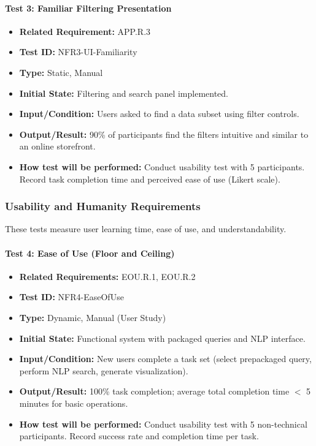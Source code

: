 \documentclass[12pt, titlepage]{article}
\begin{document}
\paragraph{Test 3: Familiar Filtering Presentation}
\begin{itemize}
    \item \textbf{Related Requirement:} APP.R.3
    \item \textbf{Test ID:} NFR3-UI-Familiarity
    \item \textbf{Type:} Static, Manual
    \item \textbf{Initial State:} Filtering and search panel implemented.
    \item \textbf{Input/Condition:} Users asked to find a data subset using filter controls.
    \item \textbf{Output/Result:} 90\% of participants find the filters intuitive and similar to an online storefront.
    \item \textbf{How test will be performed:} Conduct usability test with 5 participants. Record task completion time and perceived ease of use (Likert scale).
\end{itemize}

\subsubsection{Usability and Humanity Requirements}

These tests measure user learning time, ease of use, and understandability.

\paragraph{Test 4: Ease of Use (Floor and Ceiling)}
\begin{itemize}
    \item \textbf{Related Requirements:} EOU.R.1, EOU.R.2
    \item \textbf{Test ID:} NFR4-EaseOfUse
    \item \textbf{Type:} Dynamic, Manual (User Study)
    \item \textbf{Initial State:} Functional system with packaged queries and NLP interface.
    \item \textbf{Input/Condition:} New users complete a task set (select prepackaged query, perform NLP search, generate visualization).
    \item \textbf{Output/Result:} 100\% task completion; average total completion time $<$ 5 minutes for basic operations.
    \item \textbf{How test will be performed:} Conduct usability test with 5 non-technical participants. Record success rate and completion time per task.
\end{itemize}
\end{document}
